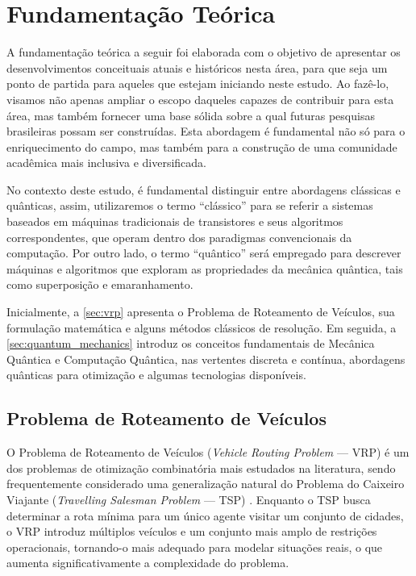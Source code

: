 \chapter{Fundamentação Teórica}

A fundamentação teórica a seguir foi elaborada com o objetivo de apresentar os desenvolvimentos conceituais atuais e históricos nesta área, para que seja um ponto de partida para aqueles que estejam iniciando neste estudo. Ao fazê-lo, visamos não apenas ampliar o escopo daqueles capazes de contribuir para esta área, mas também fornecer uma base sólida sobre a qual futuras pesquisas brasileiras possam ser construídas. Esta abordagem é fundamental não só para o enriquecimento do campo, mas também para a construção de uma comunidade acadêmica mais inclusiva e diversificada.

No contexto deste estudo, é fundamental distinguir entre abordagens clássicas e quânticas, assim, utilizaremos o termo ``clássico'' para se referir a sistemas baseados em máquinas tradicionais de transistores e seus algoritmos correspondentes, que operam dentro dos paradigmas convencionais da computação. Por outro lado, o termo ``quântico'' será empregado para descrever máquinas e algoritmos que exploram as propriedades da mecânica quântica, tais como superposição e emaranhamento.

 Inicialmente, a \autoref{sec:vrp} apresenta o Problema de Roteamento de Veículos, sua formulação matemática e alguns métodos clássicos de resolução. Em seguida, a \autoref{sec:quantum_mechanics} introduz os conceitos fundamentais de Mecânica Quântica e Computação Quântica, nas vertentes discreta e contínua, abordagens quânticas para otimização e algumas tecnologias disponíveis.
 
\section{Problema de Roteamento de Veículos}\label{sec:vrp}

O Problema de Roteamento de Veículos (\textit{Vehicle Routing Problem} — VRP) é um dos problemas de otimização combinatória mais estudados na literatura, sendo frequentemente considerado uma generalização natural do Problema do Caixeiro Viajante (\textit{Travelling Salesman Problem} — TSP) \cite{gavish1978travelling}. Enquanto o TSP busca determinar a rota mínima para um único agente visitar um conjunto de cidades, o VRP introduz múltiplos veículos e um conjunto mais amplo de restrições operacionais, tornando-o mais adequado para modelar situações reais, o que aumenta significativamente a complexidade do problema.


